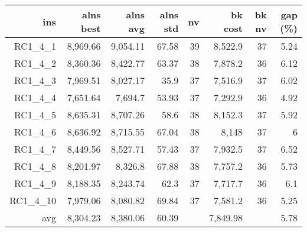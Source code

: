   \begin{table}[caption={Kết quả đo với tập HG\_RC\_1\_4 400 yêu cầu}, label=exp:HGRC14]
    \small
    \centering
    \begin{tabular}{rrrrrrrr}
    \hline
    ins & alns best & alns avg & alns std & nv & bk cost & bk nv & gap (\%) \\ \hline
    RC1\_4\_1 & 8,969.66 & 9,054.11 & 67.58 & 39 & 8,522.9 & 37 & 5.24 \\ \hline
    RC1\_4\_2 & 8,360.36 & 8,422.77 & 63.37 & 38 & 7,878.2 & 36 & 6.12 \\ \hline
    RC1\_4\_3 & 7,969.51 & 8,027.17 & 35.9 & 37 & 7,516.9 & 37 & 6.02 \\ \hline
    RC1\_4\_4 & 7,651.64 & 7,694.7 & 53.93 & 37 & 7,292.9 & 36 & 4.92 \\ \hline
    RC1\_4\_5 & 8,635.31 & 8,707.26 & 58.6 & 38 & 8,152.3 & 37 & 5.92 \\ \hline
    RC1\_4\_6 & 8,636.92 & 8,715.55 & 67.04 & 38 & 8,148 & 37 & 6 \\ \hline
    RC1\_4\_7 & 8,449.56 & 8,527.71 & 57.43 & 37 & 7,932.5 & 37 & 6.52 \\ \hline
    RC1\_4\_8 & 8,201.97 & 8,326.8 & 67.88 & 38 & 7,757.2 & 36 & 5.73 \\ \hline
    RC1\_4\_9 & 8,188.35 & 8,243.74 & 62.3 & 37 & 7,717.7 & 36 & 6.1 \\ \hline
    RC1\_4\_10 & 7,979.06 & 8,080.82 & 69.84 & 37 & 7,581.2 & 36 & 5.25 \\ \hline
    avg & 8,304.23 & 8,380.06 & 60.39 & & 7,849.98 & & 5.78 \\ \hline
    \end{tabular}
  \end{table}

